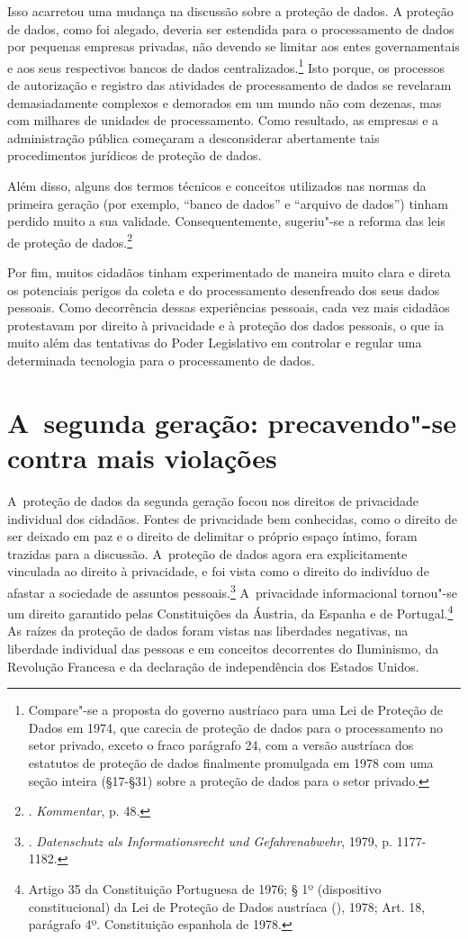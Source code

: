 Isso acarretou uma mudança na discussão sobre a proteção de dados. A
proteção de dados, como foi alegado, deveria ser estendida para o
processamento de dados por pequenas empresas privadas, não devendo se
limitar aos entes governamentais e aos seus respectivos bancos de dados
centralizados.\footnote{Compare"-se a proposta do governo austríaco para
  uma Lei de Proteção de Dados em 1974, que carecia de proteção de dados
  para o processamento no setor privado, exceto o fraco parágrafo 24,
  com a versão austríaca dos estatutos de proteção de dados finalmente
  promulgada em 1978 com uma seção inteira (§17-§31) sobre a proteção de
  dados para o setor privado.} Isto porque, os processos de autorização
e registro das atividades de processamento de dados se revelaram
demasiadamente complexos e demorados em um mundo não com dezenas, mas
com milhares de unidades de processamento. Como resultado, as empresas e
a administração pública começaram a desconsiderar abertamente tais
procedimentos jurídicos de proteção de dados.

Além disso, alguns dos termos técnicos e conceitos utilizados nas normas
da primeira geração (por exemplo, ``banco de dados'' e ``arquivo de
dados'') tinham perdido muito a sua validade. Consequentemente,
sugeriu"-se a reforma das leis de proteção de dados.\footnote{.
  \emph{Kommentar}, p. 48.}

Por fim, muitos cidadãos tinham experimentado de maneira muito clara e
direta os potenciais perigos da coleta e do processamento desenfreado
dos seus dados pessoais. Como decorrência dessas experiências pessoais,
cada vez mais cidadãos protestavam por direito à privacidade e à
proteção dos dados pessoais, o que ia muito além das tentativas do Poder
Legislativo em controlar e regular uma determinada tecnologia para o
processamento de dados.

\section{A~segunda geração: precavendo"-se contra mais violações}

A~proteção de dados da segunda geração focou nos direitos de privacidade
individual dos cidadãos. Fontes de privacidade bem conhecidas, como o
direito de ser deixado em paz e o direito de delimitar o próprio espaço
íntimo, foram trazidas para a discussão. A~proteção de dados agora era
explicitamente vinculada ao direito à privacidade, e foi vista como o
direito do indivíduo de afastar a sociedade de assuntos
pessoais.\footnote{. \emph{Datenschutz als Informationsrecht und
  Gefahrenabwehr},  1979, p. 1177-1182.} A~privacidade informacional
tornou"-se um direito garantido pelas Constituições da Áustria, da
Espanha e de Portugal.\footnote{Artigo 35 da Constituição Portuguesa de
  1976; § 1º (dispositivo constitucional) da Lei de Proteção de Dados
  austríaca (), 1978; Art. 18, parágrafo 4º. Constituição espanhola
  de 1978.} As raízes da proteção de dados foram vistas nas liberdades
negativas, na liberdade individual das pessoas e em conceitos
decorrentes do Iluminismo, da Revolução Francesa e da declaração de
independência dos Estados Unidos.


